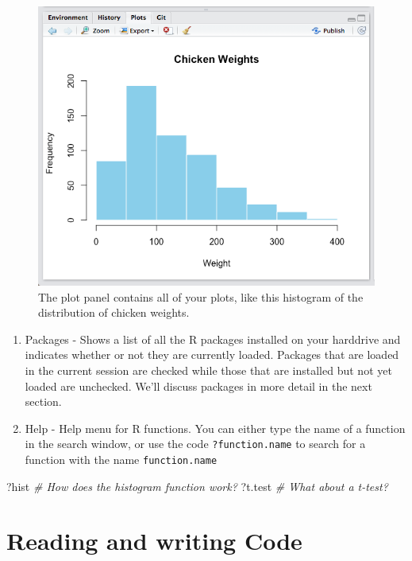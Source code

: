 \documentclass[
]{book}
\newenvironment{Shaded}{\begin{snugshade}}{\end{snugshade}}
\newcommand{\CommentTok}[1]{\textcolor[rgb]{0.56,0.35,0.01}{\textit{#1}}}
\newcommand{\NormalTok}[1]{#1}
\begin{document}
\begin{figure}
\includegraphics[width=0.75\linewidth]{images/plotpanelss} \caption{The plot panel contains all of your plots, like this histogram of the distribution of chicken weights.}\label{fig:plotpanel}
\end{figure}

\begin{enumerate}
\def\labelenumi{\arabic{enumi}.}
\setcounter{enumi}{2}
\item
  Packages - Shows a list of all the R packages installed on your harddrive and indicates whether or not they are currently loaded. Packages that are loaded in the current session are checked while those that are installed but not yet loaded are unchecked. We'll discuss packages in more detail in the next section.
\item
  Help - Help menu for R functions. You can either type the name of a function in the search window, or use the code \texttt{?function.name} to search for a function with the name \texttt{function.name}
\end{enumerate}

\begin{Shaded}
\begin{Highlighting}[]
\NormalTok{?hist   }\CommentTok{# How does the histogram function work?}
\NormalTok{?t.test }\CommentTok{# What about a t-test?}
\end{Highlighting}
\end{Shaded}

\hypertarget{reading-and-writing-code}{%
\section{Reading and writing Code}\label{reading-and-writing-code}}
\end{document}
